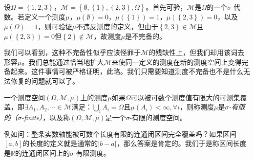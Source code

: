 \documentclass[main.tex]{subfiles}
\begin{document}
\begin{example}
    设$\Omega=\left\{1,2,3\right\}$，$\mathcal{M}=\left\{\emptyset,\left\{1\right\},\left\{2,3\right\},\Omega\right\}$。首先可验，$\mathcal{M}$是$\Omega$的一个$\sigma$-代数。若定义一个测度$\mu$，$\mu\left(\emptyset\right)=0$，$\mu\left(\left\{1\right\}\right)=1$，$\mu\left(\left\{2,3\right\}\right)=0$，以及$\mu\left(\Omega\right)=1$，则可验证$\mu$不违反测度的定义，但由于$\left\{2,3\right\}\in\mathcal{M}$且$\mu\left(\left\{2,3\right\}\right)=0$但$\left\{2\right\}\notin\mathcal{M}$，故测度$\mu$是不完备的。
\end{example}

我们可以看到，这种不完备性似乎应该怪罪于$\mathcal{M}$的残缺性上，但我们却用该词去形容$\mu$。我们总能通过恰当地扩大$\mathcal{M}$来使同一定义的测度在新的测度空间上变得完备起来。这件事情可被严格证明，此略。我们只需要知道测度不完备也不是什么无法修复的问题就可以了。

\begin{definition}
    一个测度空间$\left(\Omega,\mathcal{M},\mu\right)$上的测度$\mu$如果$\Omega$可以被可数个测度值有限大的可测集覆盖，即$\exists A_1, A_2,\cdots\in\mathcal{M}$满足：$\bigcup_{i}A_i=\Omega$且$\mu\left(A_i\right)<\infty,\forall i$，则称测度$\mu$是\emph{$\sigma$-有限的（$\sigma$-finite）}，以及称$\left(\Omega,\mathcal{M},\mu\right)$是一个$\sigma$-有限的测度空间。
\end{definition}

例如问：整条实数轴能被可数个长度有限的连通闭区间完全覆盖吗？如果区间$\left[a,b\right]$的长度的定义就是通常的$\left|b-a\right|$，那么答案是肯定的。我们于是称区间长度是$\mathbb{R}$的连通闭区间上的$\sigma$-有限测度。

\end{document}
